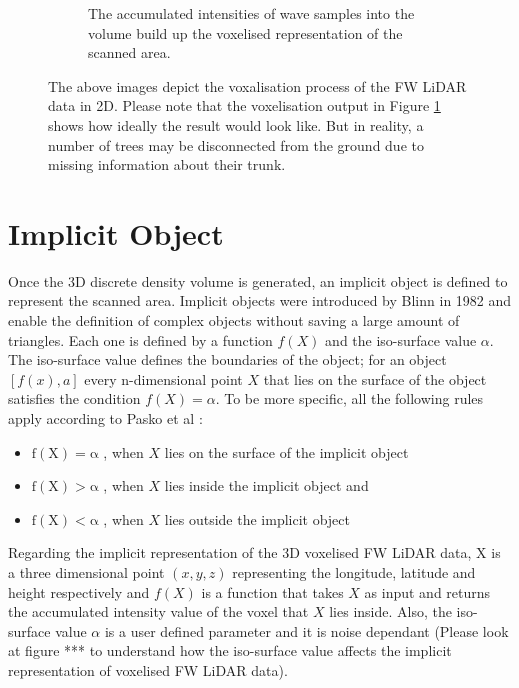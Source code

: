 \documentclass{subfiles}
\begin{document}
\begin{figure} [h!]
\begin{subfigure}[t]{.31\textwidth}
	\caption{The accumulated intensities of wave samples into the volume build up the voxelised representation of the scanned area.} 
	\label{fig:VoxelisationC_voxelised}
\end{subfigure}
\caption[Voxelisation of FW LiDAR data]{The above images depict the voxalisation process of the FW LiDAR data in 2D. Please note that the voxelisation output in Figure \ref{fig:VoxelisationC_voxelised} shows how ideally the result would look like. But in reality, a number of trees may be disconnected from the ground due to missing information about their trunk.}
\label{fig:Voxelisation}
\end{figure}


\section{Implicit Object}

\par Once the 3D discrete density volume is generated, an implicit object is defined to represent the scanned area. Implicit objects were introduced by Blinn in 1982 \cite{Blinn1982} and enable the definition of complex objects without saving a large amount of triangles. Each one is defined by a function $ \mathit{f(X)} $ and the iso-surface value $\alpha$. The iso-surface value defines the boundaries of the object; for an object $ [f(x),a]$ every n-dimensional point $ \mathit{X} $  that lies on the surface of the object satisfies the condition $ \mathit{f(X)=\alpha }  $. To be more specific, all the following rules apply according to Pasko et al \cite{Pasko1994}: 
\begin{itemize}
	\item $	\mathrm{f(X) = \alpha }$ , when $X$ lies on the surface of the implicit object
	\item $	\mathrm{f(X) > \alpha }$ , when $X$ lies inside the implicit object and
	\item $	\mathrm{f(X) < \alpha }$ , when $X$ lies outside the implicit object	 
\end{itemize}


\par Regarding the implicit representation of the 3D voxelised FW LiDAR data, X is a three dimensional point $\mathit{(x, y, z) }$ representing the longitude, latitude and height respectively and ${f(X)}$ is a function that takes  $\mathit{X}$ as input and returns the accumulated intensity value of the voxel that  $\mathit{X}$ lies inside. Also, the iso-surface value $\mathit{\alpha }$ is a user defined parameter and it is noise dependant (Please look at figure *** to understand how the iso-surface value affects the implicit representation of voxelised FW LiDAR data). 
\end{document}
